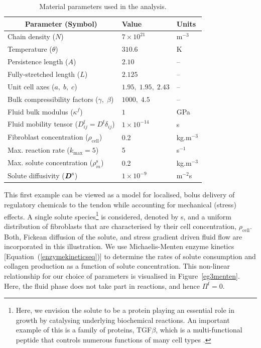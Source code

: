 \begin{table}
\centering
\begin{tabular}{lll}
\hline
\multicolumn{1}{c}{Parameter (Symbol)} & Value & Units\\
\hline
Chain density ($N$) & $7\times 10^{21}$ & $\mathrm{m}^{-3}$\\
Temperature ($\theta$)  & $310.6$ & K\\
Persistence length ($A$) & $2.10$ & --\\
Fully-stretched length ($L$) & $2.125$ & --\\
Unit cell axes ($a,\;b,\;c$) & $1.95,\;1.95,\;2.43$ & --\\
Bulk compressibility factors ($\gamma,\;\beta$) & $1000,\; 4.5$ & --\\
Fluid bulk modulus ($\kappa^f$) & $1$ & GPa\\
Fluid mobility tensor ($D^\mathrm{f}_{ij} = D^\mathrm{f}\delta_{ij}$) & $1\times 10^{-14}$
&s\\
Fibroblast concentration ($\rho_{\mathrm{cell}}$) & 0.2 &
kg.m$^{-3}$\\
Max. reaction rate ($k_{\mathrm{max}} = 5$) & 5 & s$^{-1}$\\
Max. solute concentration ($\rho^{\mathrm{s}}_m$) & 0.2 &
kg.m$^{-3}$\\
Solute diffusivity ($\mbox{\boldmath$ D$}^\mathrm{s}$) & $1\times 10^{-9}$ &  m$^{-2}$s\\
\hline
\end{tabular}
\caption{Material parameters used in the analysis.}
\label{parameters}
\end{table}

This first example can be viewed as a model for localised, bolus
delivery of regulatory chemicals to the tendon while accounting for
mechanical (stress) effects. A single solute species\footnote{Here, we
  envision the solute to be a protein playing 
  an essential role in growth by catalysing underlying biochemical
  reactions. An important example of this is a family of proteins,
  TGF$\beta$, which is a multi-functional peptide that controls numerous
  functions of many cell types \citep{Alberts:02}.} is considered,
denoted by s, and 
a uniform distribution of fibroblasts that are characterised by their
cell concentration, $\rho_{\mathrm{cell}}$. Both, Fickean diffusion of
the solute, and stress gradient driven fluid flow are incorporated in this
illustration. We use 
Michaelis-Menten enzyme kinetics [Equation~(\ref{enzymekineticseq})]
to determine the rates of solute consumption and collagen production
as a function of solute concentration. This non-linear relationship for
our choice of parameters is visualised in
Figure~\ref{eg3menten}. Here, the fluid phase does not  take part in
reactions, and hence $\Pi^\mathrm{f}=0$. 

